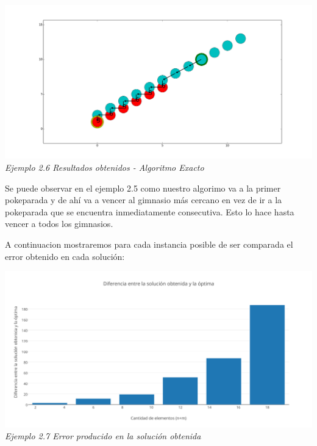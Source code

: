 \vspace*{0.3cm} \vspace*{0.3cm}
  \begin{center}
\includegraphics[scale=0.40]{./EJ2/caminosinorden.png}
\\{\textit{Ejemplo 2.6 Resultados obtenidos - Algoritmo Exacto}}
  \end{center}
  \vspace*{0.3cm}

Se puede observar en el ejemplo 2.5 como nuestro algorimo va a la primer pokeparada y de ah\'i va a vencer al gimnasio m\'as cercano en vez de ir a la pokeparada que se encuentra inmediatamente consecutiva. Esto lo hace hasta vencer a todos los gimnasios.

A continuacion mostraremos para cada instancia posible de ser comparada el error obtenido en cada soluci\'on:

\vspace*{0.3cm} \vspace*{0.3cm}
  \begin{center}
\includegraphics[scale=0.60]{./EJ2/sinOrden.png}
\\{\textit{Ejemplo 2.7 Error producido en la soluci\'on obtenida}}
  \end{center}
  \vspace*{0.3cm}


